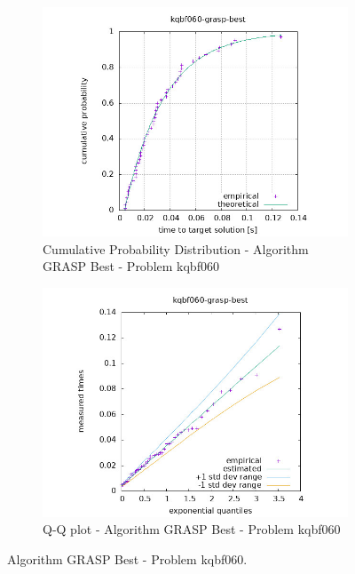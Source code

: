 \begin{figure}[H]
    \centering
    \begin{subfigure}{0.49\textwidth}
        \includegraphics[width=\textwidth]{figure/ttt_plot/kqbf060-grasp-best-exp.jpeg}
        \caption{Cumulative Probability Distribution - Algorithm GRASP Best - Problem kqbf060}
        \label{fig:grasp-best-kqbf060-exp}
    \end{subfigure}
    \hfill
    \begin{subfigure}{0.49\textwidth}
        \includegraphics[width=\textwidth]{figure/ttt_plot/kqbf060-grasp-best-qq.jpeg}
        \caption{Q-Q plot - Algorithm GRASP Best - Problem kqbf060}
        \label{fig:grasp-best-kqbf060-qq}
    \end{subfigure}
    \caption{Algorithm GRASP Best - Problem kqbf060.}
    \label{fig:grasp-best-kqbf060}
\end{figure}


